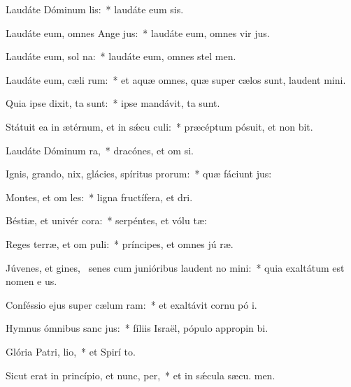 \item Laudáte Dóminum  lis:~* laudáte eum  sis.
\item Laudáte eum, omnes Ange jus:~* laudáte eum, omnes vir jus.
\item Laudáte eum, sol  na:~* laudáte eum, omnes stel  men.
\item Laudáte eum, cæli rum:~* et aquæ omnes, quæ super cælos sunt, laudent  mini.
\item Quia ipse dixit,  ta sunt:~* ipse mandávit,  ta sunt.
\item Státuit ea in ætérnum, et in sǽcu culi:~* præcéptum pósuit, et non bit.
\item Laudáte Dóminum  ra,~* dracónes, et om si.
\item Ignis, grando, nix, glácies, spíritus prorum:~* quæ fáciunt  jus:
\item Montes, et om les:~* ligna fructífera, et  dri.
\item Béstiæ, et univér cora:~* serpéntes, et vólu tæ:
\item Reges terræ, et om puli:~* príncipes, et omnes jú ræ.
\item Júvenes, et gines,~\pscross{} senes cum junióribus laudent no mini:~* quia exaltátum est nomen e us.
\item Conféssio ejus super cælum  ram:~* et exaltávit cornu pó i.
\item Hymnus ómnibus sanc jus:~* fíliis Israël, pópulo appropin bi.
\item Glória Patri,  lio,~* et Spirí to.
\item Sicut erat in princípio, et nunc,  per,~* et in sǽcula sæcu. men.
